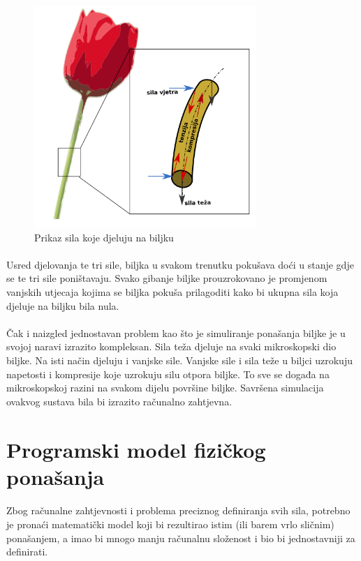 \documentclass[times, utf8, diplomski]{fer}
\begin{document}
\begin{figure}[h]
	\centering
	\includegraphics[width=0.75\textwidth]{img/31-1}
	\caption{Prikaz sila koje djeluju na biljku}
	\label{fig:31-1}
\end{figure}

\paragraph{}
Usred djelovanja te tri sile, biljka u svakom trenutku pokušava doći u stanje gdje se te tri 
sile poništavaju. Svako gibanje biljke prouzrokovano je promjenom vanjskih utjecaja kojima 
se biljka pokuša prilagoditi kako bi ukupna sila koja djeluje na biljku bila nula.

\paragraph{}
Čak i naizgled jednostavan problem kao što je simuliranje ponašanja biljke je u svojoj 
naravi izrazito kompleksan. Sila teža djeluje na svaki mikroskopski dio biljke. Na isti 
način djeluju i vanjske sile. Vanjske sile i sila teže u biljci uzrokuju napetosti i 
kompresije koje uzrokuju silu otpora biljke. To sve se događa na mikroskopskoj razini na 
svakom dijelu površine biljke. Savršena simulacija ovakvog sustava bila bi izrazito  
računalno zahtjevna.

\section{Programski model fizičkog ponašanja} \label{physics_model}
\paragraph{}
Zbog računalne zahtjevnosti i problema preciznog definiranja svih sila, potrebno je pronaći
matematički model koji bi rezultirao istim (ili barem vrlo sličnim) ponašanjem, a imao bi 
mnogo manju računalnu složenost i bio bi jednostavniji za definirati.
\end{document}
